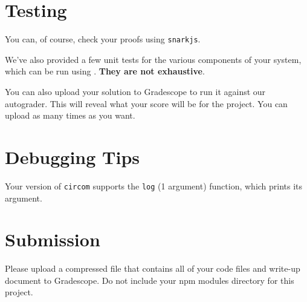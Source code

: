 \documentclass[12pt]{article}
\newcommand{\typing}[1]{\fbox{\tt #1}}
\begin{document}
\section{Testing}
You can, of course, check your proofs using \texttt{snarkjs}.

We've also provided a few unit tests for the various components of your system,
which can be run using \typing{npm test}. \textbf{They are not exhaustive}.

You can also upload your solution to Gradescope to run it against our autograder. This will reveal what your score will be for the project. You can upload as many times as you want.

\section{Debugging Tips}
Your version of \texttt{circom} supports the \texttt{log} (1 argument) function,
which prints its argument.

\section{Submission}
Please upload a compressed file that contains all of your code files and write-up document to Gradescope. Do not include your npm modules directory for this project.
\end{document}
